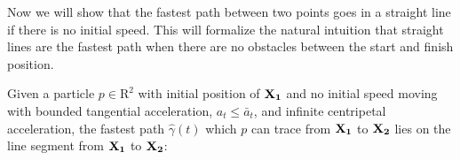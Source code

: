 
Now we will show that the fastest path between two points goes in a straight line if there is no initial speed. This will formalize the natural intuition that straight lines are the fastest path when there are no obstacles between the start and finish position.

\begin{theorem}
  \label{thm:line-proof}
  Given a particle $p \in \mathrm{R}^2$ with initial position of $\mathbf{X_1}$ and no initial speed moving with bounded tangential acceleration, $a_t \le \bar{a}_{t}$, and infinite centripetal acceleration, the fastest path $\hat{\gamma}(t)$ which $p$ can trace from $\mathbf{X_1}$ to $\mathbf{X_2}$ lies on the line segment from $\mathbf{X_1}$ to $\mathbf{X_2}$:
\end{theorem}

